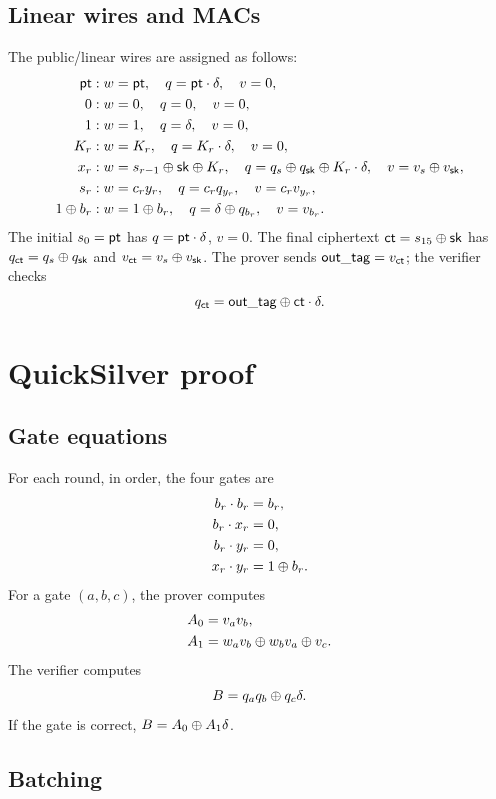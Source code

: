 \documentclass[11pt,a4paper]{article}
\begin{document}
\subsection{Linear wires and MACs}

The public/linear wires are assigned as follows:
\begin{align}
\mathsf{pt} &: w=\mathsf{pt},\quad q=\mathsf{pt}\cdot\delta,\quad v=0,\\
0 &: w=0,\quad q=0,\quad v=0,\\
1 &: w=1,\quad q=\delta,\quad v=0,\\
K_r &: w=K_r,\quad q=K_r\cdot\delta,\quad v=0,\\
x_r &: w=s_{r-1}\oplus\mathsf{sk}\oplus K_r,\quad
      q=q_s\oplus q_{\mathsf{sk}}\oplus K_r\cdot\delta,\quad
      v=v_s\oplus v_{\mathsf{sk}},\\
s_r &: w=c_r y_r,\quad q=c_r q_{y_r},\quad v=c_r v_{y_r},\\
1\oplus b_r &: w=1\oplus b_r,\quad q=\delta\oplus q_{b_r},\quad v=v_{b_r}.
\end{align}
The initial $s_0=\mathsf{pt}$ has $q=\mathsf{pt}\cdot\delta$, $v=0$. The final ciphertext
$\mathsf{ct}=s_{15}\oplus\mathsf{sk}$ has
$q_{\mathsf{ct}}=q_s\oplus q_{\mathsf{sk}}$ and $v_{\mathsf{ct}}=v_s\oplus v_{\mathsf{sk}}$. The prover sends
$\mathsf{out\_tag}=v_{\mathsf{ct}}$; the verifier checks
\[
q_{\mathsf{ct}}=\mathsf{out\_tag}\oplus\mathsf{ct}\cdot\delta.
\]

\section{QuickSilver proof}
\label{sec:quicksilver}

\subsection{Gate equations}

For each round, in order, the four gates are
\begin{align}
b_r\cdot b_r&=b_r,\\
b_r\cdot x_r&=0,\\
b_r\cdot y_r&=0,\\
x_r\cdot y_r&=1\oplus b_r.
\end{align}
For a gate $(a,b,c)$, the prover computes
\begin{align}
A_0 &= v_a v_b,\\
A_1  &= w_a v_b\oplus w_b v_a\oplus v_c.
\end{align}
The verifier computes
\[
B=q_a q_b\oplus q_c\delta.
\]
If the gate is correct, $B=A_0\oplus A_1\delta$.

\subsection{Batching}
\end{document}
